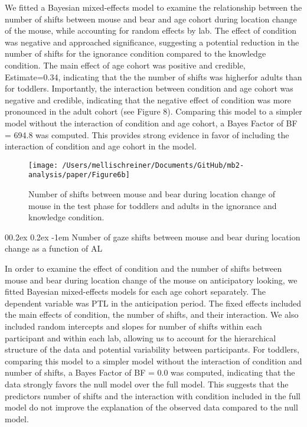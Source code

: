 \documentclass[
  english,
  man,floatsintext]{apa6}
\makeatletter
\let\oldparagraph\paragraph
\renewcommand{\paragraph}[1]{\oldparagraph{#1}\mbox{}}
\renewcommand{\paragraph}{\@startsection{paragraph}{4}{\parindent}%
  {0\baselineskip \@plus 0.2ex \@minus 0.2ex}%
  {-1em}%
  {\normalfont\normalsize\bfseries\itshape\typesectitle}}
\makeatother
\begin{document}
We fitted a Bayesian mixed-effects model to examine the relationship between the number of shifts between mouse and bear and age cohort during location change of the mouse, while accounting for random effects by lab. The effect of condition was negative and approached significance, suggesting a potential reduction in the number of shifts for the ignorance condition compared to the knowledge condition. The main effect of age cohort was positive and credible, Estimate=0.34, indicating that the the number of shifts was higherfor adults than for toddlers. Importantly, the interaction between condition and age cohort was negative and credible, indicating that the negative effect of condition was more pronounced in the adult cohort (see Figure 8). Comparing this model to a simpler model without the interaction of condition and age cohort, a Bayes Factor of BF = 694.8 was computed. This provides strong evidence in favor of including the interaction of condition and age cohort in the model.

\begin{figure}

{\centering \texttt{[image: /Users/mellischreiner/Documents/GitHub/mb2-analysis/paper/Figure6b]} 

}

\caption{Number of shifts between mouse and bear during location change of mouse in the test phase for toddlers and adults in the ignorance and knowledge condition.}\label{fig:fig8}
\end{figure}

\hypertarget{number-of-gaze-shifts-between-mouse-and-bear-during-location-change-as-a-function-of-al}{%
\paragraph{Number of gaze shifts between mouse and bear during location change as a function of AL}\label{number-of-gaze-shifts-between-mouse-and-bear-during-location-change-as-a-function-of-al}}

In order to examine the effect of condition and the number of shifts between mouse and bear during location change of the mouse on anticipatory looking, we fitted Bayesian mixed-effects models for each age cohort separately. The dependent variable was PTL in the anticipation period. The fixed effects included the main effects of condition, the number of shifts, and their interaction. We also included random intercepts and slopes for number of shifts within each participant and within each lab, allowing us to account for the hierarchical structure of the data and potential variability between participants. For toddlers, comparing this model to a simpler model without the interaction of condition and number of shifts, a Bayes Factor of BF = 0.0 was computed, indicating that the data strongly favors the null model over the full model. This suggests that the predictors number of shifts and the interaction with condition included in the full model do not improve the explanation of the observed data compared to the null model.
\end{document}
